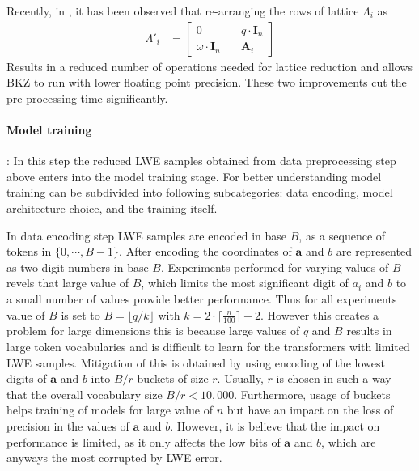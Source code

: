 Recently, in \cite{li2023salsaver}, it has been observed that re-arranging the rows of lattice $\Lambda_i$ as
\begin{align*}
    \Lambda'_i &= \begin{bmatrix}
                0                         \hspace{1em} &  q \cdot \textbf{I}_n \\
                \omega \cdot \textbf{I}_n \hspace{1em} &  \textbf{A}_i
            \end{bmatrix}
\end{align*}
Results in a reduced number of operations needed for lattice reduction and allows BKZ to run with lower floating point precision. These two improvements cut the pre-processing time significantly.


\paragraph{Model training}: In this step the reduced LWE samples obtained from data preprocessing step above enters into the model training stage. For better understanding model training can be subdivided into following subcategories: data encoding, model architecture choice, and the training itself.

In data encoding step LWE samples are encoded in base $B$, as a sequence of tokens in $\{0, \cdots, B-1\}$. After encoding the coordinates of $\textbf{a}$ and $b$ are represented as two digit numbers in base $B$. Experiments performed for varying values of $B$ revels that large value of $B$, which limits the most significant digit of $a_i$ and $b$ to a small number of values provide better performance. Thus for all experiments value of $B$ is set to $B=\lfloor q/k \rfloor$ with $k=2\cdot \lceil \frac{n}{100}\rceil + 2$. However this creates a problem for large dimensions this is because large values of $q$ and $B$ results in large token vocabularies and is difficult to learn for the transformers with limited LWE samples. Mitigation of this is obtained by using encoding of the lowest digits of $\textbf{a}$ and $b$ into $B/r$ buckets of size $r$. Usually, $r$ is chosen in such a way that the  overall vocabulary size $B/r< 10,000$. Furthermore, usage of buckets helps training of models for large value of $n$ but have an impact on the loss of precision in the values of $\textbf{a}$ and $b$. However, it is believe that the impact on performance is limited, as it only affects the low bits of $\textbf{a}$ and $b$, which are anyways the most corrupted by LWE error.

